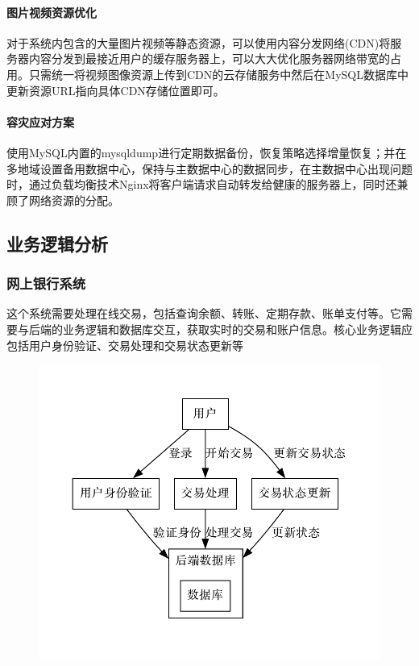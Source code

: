 \documentclass[UTF8]{ctexart} %
\begin{document}
\paragraph{图片视频资源优化} 对于系统内包含的大量图片视频等静态资源，可以使用内容分发网络(CDN)将服务器内容分发到最接近用户的缓存服务器上，可以大大优化服务器网络带宽的占用。只需统一将视频图像资源上传到CDN的云存储服务中然后在MySQL数据库中更新资源URL指向具体CDN存储位置即可。

\paragraph{容灾应对方案} 使用MySQL内置的mysqldump进行定期数据备份，恢复策略选择增量恢复；并在多地域设置备用数据中心，保持与主数据中心的数据同步，在主数据中心出现问题时，通过负载均衡技术Nginx将客户端请求自动转发给健康的服务器上，同时还兼顾了网络资源的分配。

\subsection{业务逻辑分析}

\subsubsection{网上银行系统}

这个系统需要处理在线交易，包括查询余额、转账、定期存款、账单支付等。它需要与后端的业务逻辑和数据库交互，获取实时的交易和账户信息。核心业务逻辑应包括用户身份验证、交易处理和交易状态更新等

\begin{figure}[H]
    \centering
    \includegraphics[width=\textwidth]{assets/onlinebanking.pdf}
\end{figure}
\end{document}
